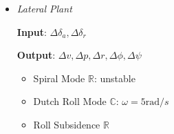 \documentclass[landscape,a0paper,fontscale=0.285]{baposter} %
\newcommand{\compresslist}{ %
\setlength{\itemsep}{1pt}
\setlength{\parskip}{0pt}
\setlength{\parsep}{0pt}
}
\begin{document}
\begin{poster}
{\begin{itemize}
      \textbf{Input}: $\Delta \delta_e, \Delta\delta_T$
      
      \textbf{Output}: $\Delta u, \Delta w, \Delta q,\Delta\theta$
      \begin{itemize}[label=$\circ$]\compresslist
        \item Short Period Mode $\mathbb{C}$: $\omega=5\text{rad}/s$ 
        \item Exchange between kinetic and potential energy: slow
        \item Phugoid Mode $\mathbb{C}$: $\omega = 0.6~\text{rad}/s$
        \item Oscillation of angle of attack: fast
    \end{itemize}
\item \textit{Lateral Plant}

  \textbf{Input}: $\Delta \delta_a, \Delta \delta_r$
  
  \textbf{Output}: $\Delta v,\Delta p, \Delta r, \Delta\phi,\Delta\psi$
  \begin{itemize}[label=$\circ$]\compresslist
    \item Spiral Mode $\mathbb{R}$: unstable
    \item Dutch Roll Mode $\mathbb{C}$: $\omega = 5\text{rad}/s$
    \item Roll Subsidence $\mathbb{R}$
  \end{itemize}
\end{itemize}
}

\end{poster}
\end{document}
